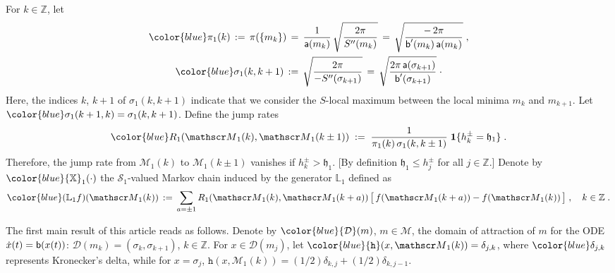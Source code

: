 \documentclass[reqno]{amsart}
\theoremstyle{plain}
\theoremstyle{definition}
\newcommand{\mc}[1]{{\mathcal #1}}
\newcommand{\mb}[1]{{\mathbf #1}}
\newcommand{\mf}[1]{{\mathfrak #1}}
\newcommand{\bb}[1]{{\mathbb #1}}
\newcommand{\ms}[1]{{\mathscr #1}}
\newcommand{\mss}[1]{{\textsf #1}}
\newcommand{\mtt}[1]{{\mathtt #1}}
\newcounter{as}[section]
\newcommand{\<}{\langle}
\renewcommand{\>}{\rangle}
\begin{document}
For $k\in\bb Z$, let
\begin{equation}
\label{04}
\begin{gathered}
{\color{blue}\pi_{1}(k) \, :=\, \pi(\{m_k\})} \,=\,
\frac{1}{\mss a(m_k)}\, \sqrt{\frac{2\pi}{S''(m_k)}}
\,=\, \sqrt{\frac{-\, 2\pi}{\mss b'(m_k)\, \mss a(m_k)}} \;,
\\
{\color{blue} \sigma_1(k,k+1)}
\, :=\,  \sqrt{\frac{2\pi}{- S''(\sigma_{k+1})}}
\,=\, \sqrt{\frac{2\pi \, \mss a(\sigma_{k+1}) }{\mss b'(\sigma_{k+1})}}
\;\cdot
\end{gathered}
\end{equation}
Here, the indices $k$, $k+1$ of $\sigma_1(k,k+1)$ indicate that we
consider the $S$-local maximum between the local minima $m_k$ and
$m_{k+1}$.  Let $\color{blue} \sigma_1(k+1,k) = \sigma_1(k,k+1)$.
Define the jump rates
\begin{equation}
\label{73}
{\color{blue} R_1 (\ms M_{1}(k),\ms M_{1}(k\pm 1))} \; := \;
\frac{1}{\pi_{1}(k)\, \sigma_1(k,k\pm 1) }
\; \mb 1\{ h^{\pm }_{k} = \mf h_1\} \;.
\end{equation}
Therefore, the jump rate from $\ms M_{1}(k)$ to $\ms M_{1}(k\pm 1)$
vanishes if $h^{\pm }_{k} > \mf h_1$. [By definition
$\mf h_1 \le h^{\pm }_{j}$ for all $j\in\bb Z$.]  Denote by
$\color{blue} \bb X_1 (\cdot)$ the $\ms S_{1}$-valued Markov chain
induced by the generator $\mathbb{L}_1$ defined as
\begin{equation}
\label{72b}
{\color{blue} (\bb L_1 f)(\ms M_{1}(k))} \,:=\, 
\sum_{a = \pm 1} R_1(\ms M_{1}(k), \ms M_{1}(k+a))\,
\big[\, f(\ms M_{1}(k+a)) - f(\ms M_{1}(k))\, \big]\;, \quad k\in \bb
Z\;. 
\end{equation}

The first main result of this article reads as follows.  Denote by
$\color{blue} \mc D(m)$, $m\in\mc M$, the domain of attraction of $m$
for the ODE $\dot x(t) = \mss b(x(t))$:
$\mc D(m_k) = (\sigma_k, \sigma_{k+1})$, $k\in\bb Z$. For
$x\in \mc D(m_j)$, let
${\color{blue} \mtt h(x, \ms M_1(k))} = \delta_{j,k}$, where
$\color{blue} \delta_{j,k}$ represents Kronecker's delta, while for
$x=\sigma_j$,
$\mtt h(x, \ms M_1(k)) = (1/2) \delta_{k,j} + (1/2) \delta_{k,j-1}$.
\end{document}
